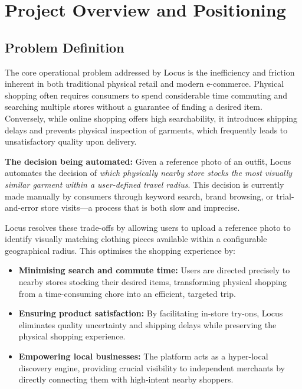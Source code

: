 \documentclass[12pt]{article}
\begin{document}
\section{Project Overview and Positioning}

\subsection{Problem Definition}

The core operational problem addressed by Locus is the inefficiency and friction inherent in both traditional physical retail and modern e-commerce. Physical shopping often requires consumers to spend considerable time commuting and searching multiple stores without a guarantee of finding a desired item. Conversely, while online shopping offers high searchability, it introduces shipping delays and prevents physical inspection of garments, which frequently leads to unsatisfactory quality upon delivery.

\textbf{The decision being automated:} Given a reference photo of an outfit, Locus automates the decision of \emph{which physically nearby store stocks the most visually similar garment within a user-defined travel radius}. This decision is currently made manually by consumers through keyword search, brand browsing, or trial-and-error store visits---a process that is both slow and imprecise.

Locus resolves these trade-offs by allowing users to upload a reference photo to identify visually matching clothing pieces available within a configurable geographical radius. This optimises the shopping experience by:

\begin{itemize}
  \item \textbf{Minimising search and commute time:} Users are directed precisely to nearby stores stocking their desired items, transforming physical shopping from a time-consuming chore into an efficient, targeted trip.
  \item \textbf{Ensuring product satisfaction:} By facilitating in-store try-ons, Locus eliminates quality uncertainty and shipping delays while preserving the physical shopping experience.
  \item \textbf{Empowering local businesses:} The platform acts as a hyper-local discovery engine, providing crucial visibility to independent merchants by directly connecting them with high-intent nearby shoppers.
\end{itemize}
\end{document}
